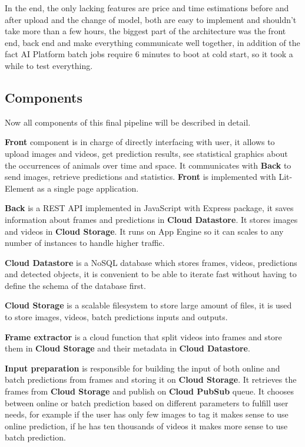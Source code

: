 In the end, the only lacking features are price and time estimations before and after upload and the change of model, both are easy to implement and shouldn't take more than a few hours, the biggest part of the architecture was the front end, back end and make everything communicate well together, in addition of the fact AI Platform batch jobs require 6 minutes to boot at cold start, so it took a while to test everything.

\pagebreak\subsection{Components}

Now all components of this final pipeline will be described in detail.

\textbf{Front} component is in charge of directly interfacing with user, it allows to upload images and videos, get prediction results, see statistical graphics about the occurrences of animals over time and space.
It communicates with \textbf{Back} to send images, retrieve predictions and statistics.
\textbf{Front} is implemented with Lit-Element as a single page application.

\textbf{Back} is a REST API implemented in JavaScript with Express package, it saves information about frames and predictions in \textbf{Cloud Datastore}. It stores images and videos in \textbf{Cloud Storage}.
It runs on App Engine so it can scales to any number of instances to handle higher traffic.

\textbf{Cloud Datastore} is a NoSQL database which stores frames, videos, predictions and detected objects, it is convenient to be able to iterate fast without having to define the schema of the database first.

\textbf{Cloud Storage} is a scalable filesystem to store large amount of files, it is used to store images, videos, batch predictions inputs and outputs.

\textbf{Frame extractor} is a cloud function that split videos into frames and store them in \textbf{Cloud Storage} and their metadata in \textbf{Cloud Datastore}.

\textbf{Input preparation} is responsible for building the input of both online and batch predictions from frames and storing it on \textbf{Cloud Storage}. It retrieves the frames from \textbf{Cloud Storage} and publish on \textbf{Cloud PubSub} queue.
It chooses between online or batch prediction based on different parameters to fulfill user needs, for example if the user has only few images to tag it makes sense to use online prediction, if he has ten thousands of videos it makes more sense to use batch prediction.

